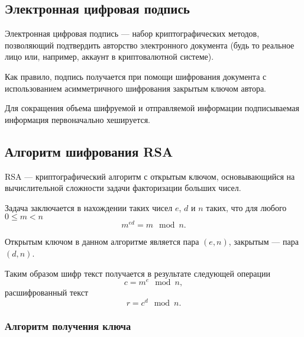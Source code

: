 
\vspace{-1\baselineskip}

%     

\subsection{Электронная цифровая подпись}

Электронная цифровая подпись --- набор криптографических методов, позволяющий
подтвердить авторство электронного документа (будь то реальное лицо или,
например, аккаунт в криптовалютной системе).

Как правило, подпись получается при помощи шифрования документа с
использованием асимметричного шифрования закрытым ключом автора.

Для сокращения объема шифруемой и отправляемой информации подписываемая
информация первоначально хешируется.

\subsection{Алгоритм шифрования RSA}

RSA --- криптографический алгоритм с открытым ключом, основывающийся на
вычислительной сложности задачи факторизации больших чисел.

Задача заключается в нахождении таких чисел $e$, $d$ и $n$ таких, что для
любого $0 \le m < n$
\begin{equation*}
    m^{ed} = m \mod{n}.
\end{equation*}

Открытым ключом в данном алгоритме является пара $(e, n)$, закрытым ---
пара $(d, n)$.

Таким образом шифр текст получается в результате следующей операции
\begin{equation*}
    c = m^e \mod n,
\end{equation*}
расшифрованный текст
\begin{equation*}
    r = c^d \mod n.
\end{equation*}

\subsubsection{Алгоритм получения ключа}

